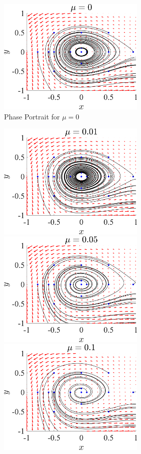 \documentclass[11pt]{article}
\begin{document}
\begin{figure}[h]
\centering
\includegraphics[width=7cm]{Hopf_823_phase_mu0.png}
\caption{Phase Portrait for $\mu = 0$}
\end{figure}

\begin{figure}[h]
\centering
\includegraphics[width=7cm]{Hopf_823_phase_mu0.01.png}
\includegraphics[width=7cm]{Hopf_823_phase_mu0.05.png}
\includegraphics[width=7cm]{Hopf_823_phase_mu0.1.png}

\end{figure}
\end{document}
